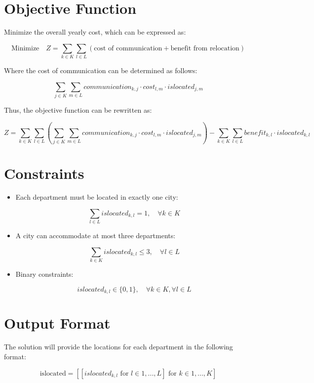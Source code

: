\documentclass{article}
\begin{document}
\section*{Objective Function}

Minimize the overall yearly cost, which can be expressed as:

\[
\text{Minimize} \quad Z = \sum_{k \in K} \sum_{l \in L} \left( \text{cost of communication} + \text{benefit from relocation} \right)
\]

Where the cost of communication can be determined as follows:

\[
\sum_{j \in K} \sum_{m \in L} communication_{k, j} \cdot cost_{l, m} \cdot islocated_{j, m}
\]

Thus, the objective function can be rewritten as:

\[
Z = \sum_{k \in K} \sum_{l \in L} \left( \sum_{j \in K} \sum_{m \in L} communication_{k, j} \cdot cost_{l, m} \cdot islocated_{j, m} \right) - \sum_{k \in K} \sum_{l \in L} benefit_{k, l} \cdot islocated_{k, l}
\]

\section*{Constraints}

\begin{itemize}
    \item Each department must be located in exactly one city:

    \[
    \sum_{l \in L} islocated_{k, l} = 1, \quad \forall k \in K
    \]

    \item A city can accommodate at most three departments:

    \[
    \sum_{k \in K} islocated_{k, l} \leq 3, \quad \forall l \in L
    \]

    \item Binary constraints:

    \[
    islocated_{k, l} \in \{0, 1\}, \quad \forall k \in K, \forall l \in L
    \]
\end{itemize}

\section*{Output Format}

The solution will provide the locations for each department in the following format:

\[
\text{islocated} = [[islocated_{k, l} \text{ for } l \in 1,...,L] \text{ for } k \in 1,...,K]
\]
\end{document}
